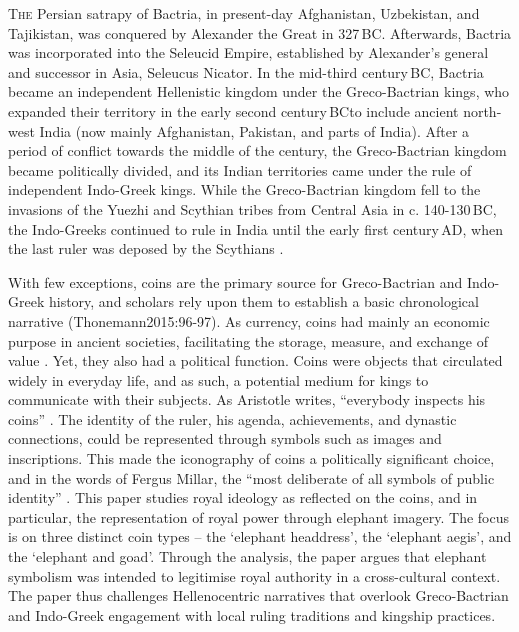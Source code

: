 \documentclass{ijsra}
\renewcommand\AD{{\,AD\xspace}}
\renewcommand\BC{{\,BC\xspace}}
\begin{document}
\IJSRAopening%

\lettrine{T}{he} Persian satrapy of Bactria, in present-day Afghanistan, Uzbekistan, and Tajikistan,
was conquered by Alexander the Great in 327\BC.
Afterwards, Bactria was incorporated into the Seleucid Empire, established by Alexander’s general and successor in Asia,
Seleucus Nicator.
In the mid-third century\BC, Bactria became an independent Hellenistic kingdom under the Greco-Bactrian kings, 
who expanded their territory in the early second century\BC to include ancient north-west India (now mainly Afghanistan, Pakistan,
and parts of India).
After a period of conflict towards the middle of the century, the Greco-Bactrian kingdom became politically divided,
and its Indian territories came under the rule of independent Indo-Greek kings.
While the Greco-Bactrian kingdom fell to the invasions of the Yuezhi and Scythian tribes from Central Asia in c. 140-130\BC,
the Indo-Greeks continued to rule in India until the early first century\AD, when the last ruler was deposed by the Scythians
\parencite[47--51]{Bopearachchi2011}. 

With few exceptions, coins are the primary source for Greco-Bactrian and Indo-Greek history, and scholars rely upon them to establish
a basic chronological narrative (Thonemann2015:96-97).
As currency, coins had mainly an economic purpose in ancient societies, facilitating the storage, measure, and exchange of value
\parencite[11]{Howgego1995}.
Yet, they also had a political function.
Coins were objects that circulated widely in everyday life, and as such, a potential medium for kings to communicate with their subjects.
As Aristotle writes, “everybody inspects his coins” \parencite[120]{Holt1999}.
The identity of the ruler, his agenda, achievements, and dynastic connections, could be represented through symbols such as images
and inscriptions.
This made the iconography of coins a politically significant choice, and in the words of Fergus Millar, the “most deliberate of all
symbols of public identity” \parencite[66]{Thonemann2015}.
This paper studies royal ideology as reflected on the coins, and in particular, the representation of royal power through elephant imagery.
The focus is on three distinct coin types – the ‘elephant headdress’, the ‘elephant aegis’, and the ‘elephant and goad’.
Through the analysis, the paper argues that elephant symbolism was intended to legitimise royal authority in a cross-cultural context.
The paper thus challenges Hellenocentric narratives that overlook Greco-Bactrian and Indo-Greek engagement with local ruling traditions
and kingship practices.
\end{document}
